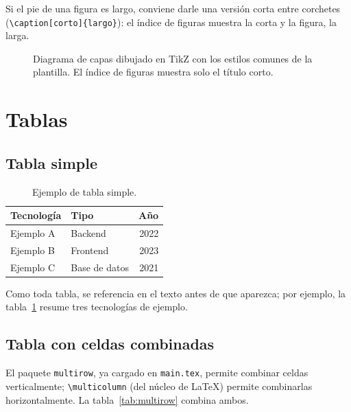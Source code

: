 Si el pie de una figura es largo, conviene darle una versión corta entre corchetes (\lstinline[language=enparrafo]!\caption[corto]{largo}!): el índice de figuras muestra la corta y la figura, la larga.

\begin{figure}[H]
  \centering
  
  \caption[Diagrama de capas en TikZ]{Diagrama de capas dibujado en TikZ con los estilos comunes de la plantilla. El índice de figuras muestra solo el título corto.}
  \label{fig:tikz-capas}
\end{figure}

\section{Tablas}
\label{sec:tablas}

\subsection{Tabla simple}

\begin{table}[H]
  \centering
  \begin{tabular}{l l r}
    \hline
    \textbf{Tecnología} & \textbf{Tipo} & \textbf{Año} \\
    \hline
    Ejemplo A & Backend        & 2022 \\
    Ejemplo B & Frontend       & 2023 \\
    Ejemplo C & Base de datos  & 2021 \\
    \hline
  \end{tabular}
  \caption{Ejemplo de tabla simple.}
  \label{tab:simple}
\end{table}

Como toda tabla, se referencia en el texto antes de que aparezca; por ejemplo, la tabla~\ref{tab:simple} resume tres tecnologías de ejemplo.

\subsection{Tabla con celdas combinadas}

El paquete \texttt{multirow}, ya cargado en \texttt{main.tex}, permite combinar celdas verticalmente; \lstinline[language=enparrafo]!\multicolumn! (del núcleo de \LaTeX{}) permite combinarlas horizontalmente. La tabla~\ref{tab:multirow} combina ambos.

